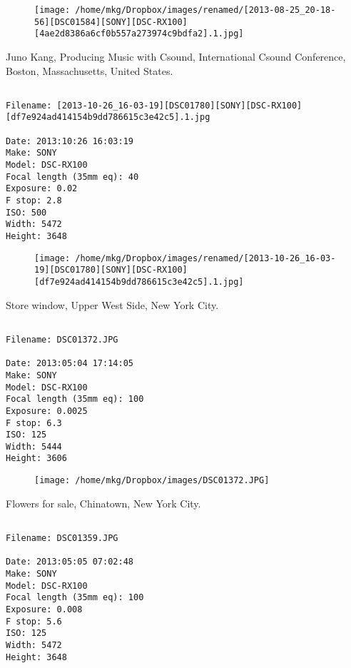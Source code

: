 \begin{figure}
\texttt{[image: /home/mkg/Dropbox/images/renamed/[2013-08-25\_20-18-56][DSC01584][SONY][DSC-RX100][4ae2d8386a6cf0b557a273974c9bdfa2].1.jpg]}
\end{figure}
    
\clearpage
\onecolumn
\noindent Juno Kang, Producing Music with Csound, International Csound Conference, Boston, Massachusetts, United States.
\noindent
\begin{lstlisting}

Filename: [2013-10-26_16-03-19][DSC01780][SONY][DSC-RX100][df7e924ad414154b9dd786615c3e42c5].1.jpg

Date: 2013:10:26 16:03:19
Make: SONY
Model: DSC-RX100
Focal length (35mm eq): 40
Exposure: 0.02
F stop: 2.8
ISO: 500
Width: 5472
Height: 3648
\end{lstlisting}
\clearpage

\begin{figure}
\texttt{[image: /home/mkg/Dropbox/images/renamed/[2013-10-26\_16-03-19][DSC01780][SONY][DSC-RX100][df7e924ad414154b9dd786615c3e42c5].1.jpg]}
\end{figure}
    
\clearpage
\onecolumn
\noindent Store window, Upper West Side, New York City.
\noindent
\begin{lstlisting}

Filename: DSC01372.JPG

Date: 2013:05:04 17:14:05
Make: SONY
Model: DSC-RX100
Focal length (35mm eq): 100
Exposure: 0.0025
F stop: 6.3
ISO: 125
Width: 5444
Height: 3606
\end{lstlisting}
\clearpage

\begin{figure}
\texttt{[image: /home/mkg/Dropbox/images/DSC01372.JPG]}
\end{figure}
    
\clearpage
\onecolumn
\noindent Flowers for sale, Chinatown, New York City.
\noindent
\begin{lstlisting}

Filename: DSC01359.JPG

Date: 2013:05:05 07:02:48
Make: SONY
Model: DSC-RX100
Focal length (35mm eq): 100
Exposure: 0.008
F stop: 5.6
ISO: 125
Width: 5472
Height: 3648
\end{lstlisting}
\clearpage

